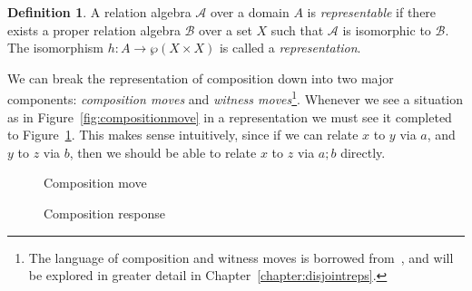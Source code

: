 \documentclass[12pt]{article}
\theoremstyle{definition}
\newtheorem{definition}[subsection]{Definition}
\newcommand{\A}{\mathcal{A} }
\newcommand{\comp}{\mathbin{;}}%
\begin{document}
\begin{definition}\label{defn:representation}
  A relation algebra $\A$ over a domain $A$ is \emph{representable} if there exists a proper relation algebra $\mathcal{B}$ over a set $X$ such that $\A$ is isomorphic to $\mathcal{B}$. The isomorphism $h : A \to \wp(X \times X)$ is called a \emph{representation}.
\end{definition}

  We can break the representation of composition down into two major components: \emph{composition moves} and \emph{witness moves}\footnote{The language of composition and witness moves is borrowed from~\cite{Hirsch2005}, and will be explored in greater detail in Chapter~\ref{chapter:disjointreps}.}. Whenever we see a situation as in Figure~\ref{fig:compositionmove} in a representation we must see it completed to Figure~\ref{fig:compositionresponse}. This makes sense intuitively, since if we can relate $x$ to $y$ via $a$, and $y$ to $z$ via $b$, then we should be able to relate $x$ to $z$ via $a \comp b$ directly.

\begin{figure}[ht]
\noindent\begin{minipage}{0.45\textwidth}
\centering
{} 
\caption{Composition move}\label{fig:compositionmove}
\end{minipage}\hfill
\begin{minipage}{0.45\textwidth}
\centering
{}
\caption{Composition response}\label{fig:compositionresponse}
\end{minipage}
\end{figure}
\end{document}
